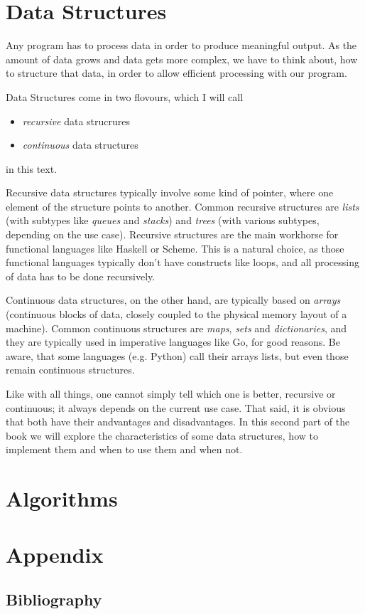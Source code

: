 \documentclass{scrbook}
\numberwithin{equation}{chapter}
\theoremstyle{definition}
\begin{document}





\part{Data Structures}

Any program has to process data in order to produce meaningful output.
As the amount of data grows and data gets more complex, we have to think about,
how to structure that data, in order to allow efficient processing with our program.

Data Structures come in two flovours, which I will call
\begin{itemize}
  \item \emph{recursive} data strucrures
  \item \emph{continuous} data structures
\end{itemize}

in this text.

Recursive data structures typically involve some kind of pointer,
where one element of the structure points to another.
Common recursive structures are \emph{lists} (with subtypes like \emph{queues}
and \emph{stacks}) and \emph{trees} (with various subtypes, depending on the use case).
Recursive structures are the main workhorse for functional languages like
Haskell or Scheme. This is a natural choice, as those functional languages typically
don't have constructs like loops, and all processing of data has to be done recursively.

Continuous data structures, on the other hand, are typically based on \emph{arrays}
(continuous blocks of data, closely coupled to the physical memory layout of a machine).
Common continuous structures are \emph{maps}, \emph{sets} and \emph{dictionaries},
and they are typically used in imperative languages like Go, for good reasons.
Be aware, that some languages (e.g. Python) call their arrays lists, but even those remain
continuous structures.

Like with all things, one cannot simply tell which one is better, recursive or continuous;
it always depends on the current use case.
That said, it is obvious that both have their andvantages and disadvantages.
In this second part of the book we will explore the characteristics of some data structures,
how to implement them and when to use them and when not.






\part{Algorithms}


\part{Appendix}
\appendix


\backmatter
\chapter{Bibliography}
\end{document}
